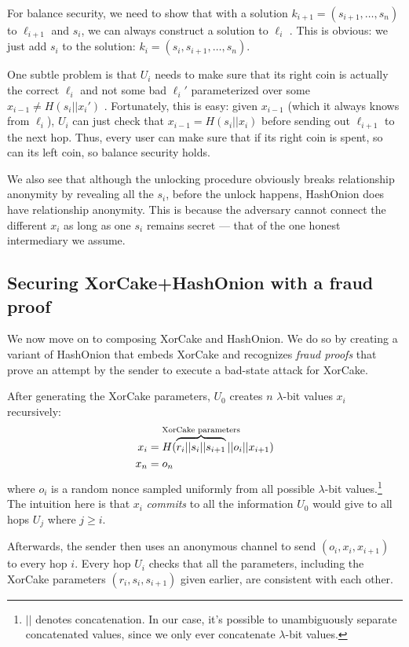 \documentclass[USenglish,oneside,twocolumn]{article}
\begin{document}
For balance security, we need to show that with a solution $k_{i+1}=(s_{i+1}, \dots, s_{n})$ to $\ell_{i+1}$ and $s_i$, we can always construct a solution to $\ell_i$ . This is obvious: we just add $s_i$ to the solution: $k_i=(s_i,s_{i+1}, \dots, s_n)$.

One subtle problem is that $U_i$ needs to make sure that its right coin is actually the correct $\ell_i$ and not some bad $\ell_i'$ parameterized over some $x_{i-1} \neq H(s_i || x_i')$ . Fortunately, this is easy: given $x_{i-1}$ (which it always knows from $\ell_i$), $U_i$ can just check that $x_{i-1} =H(s_i||x_i)$ before sending out $\ell_{i+1}$ to the next hop. Thus, every user can make sure that if its right coin is spent, so can its left coin, so balance security holds.

We also see that although the unlocking procedure obviously breaks relationship anonymity by revealing all the $s_i$, before the unlock happens, HashOnion does have relationship anonymity. This is because the adversary cannot connect the different $x_i$ as long as one $s_i$ remains secret --- that of the one honest intermediary we assume.

\subsection{Securing XorCake+HashOnion with a fraud proof}

We now move on to composing XorCake and HashOnion. We do so by creating a variant of HashOnion that embeds XorCake and recognizes \emph{fraud proofs} that prove an attempt by the sender to execute a bad-state attack for XorCake.

After generating the XorCake parameters, $U_0$ creates $n$ $\lambda$-bit values $x_i$ recursively:
\begin{align*}
    x_i & = H(\overbrace{r_i||s_i||s_{i+1}}^{\mathclap{\text{XorCake parameters}}}||o_i||x_{i+1}) \\
    x_n & = o_n
\end{align*}
where $o_i$ is a random nonce sampled uniformly from all possible $\lambda$-bit values.\footnote{$||$ denotes concatenation. In our case, it's possible to unambiguously separate concatenated values, since we only ever concatenate $\lambda$-bit values.} The intuition here is that $x_i$ \emph{commits} to all the information $U_0$ would give to all hops $U_j$ where $j\geq i$.

Afterwards, the sender then uses an anonymous channel to send $(o_i,x_i,x_{i+1})$ to every hop $i$. Every hop $U_i$ checks that all the parameters, including the XorCake parameters $(r_i,s_i,s_{i+1})$ given earlier, are consistent with each other.
\end{document}
